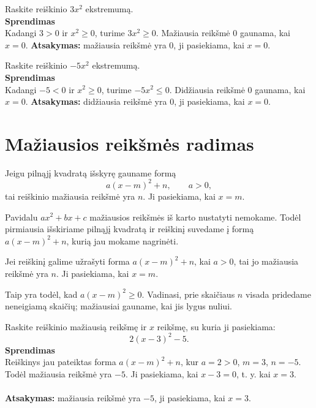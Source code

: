 \documentclass[11pt,a4paper]{scrartcl}
\begin{document}
\begin{example}
Raskite reiškinio $3x^2$ ekstremumą.\\
\textbf{Sprendimas}\\
Kadangi $3>0$ ir $x^2\geq0$, turime $3x^2\geq0$. Mažiausia reikšmė $0$ gaunama, kai $x=0$.
\textbf{Atsakymas:} mažiausia reikšmė yra $0$, ji pasiekiama, kai $x=0$.
\end{example}

\begin{example}
Raskite reiškinio $-5x^2$ ekstremumą.\\
\textbf{Sprendimas}\\
Kadangi $-5<0$ ir $x^2\geq0$, turime $-5x^2\leq0$. Didžiausia reikšmė $0$ gaunama, kai $x=0$.
\textbf{Atsakymas:} didžiausia reikšmė yra $0$, ji pasiekiama, kai $x=0$.
\end{example}

\section{Mažiausios reikšmės radimas}

Jeigu pilnąjį kvadratą išskyrę gauname formą
\[
a(x-m)^2+n, \qquad a>0,
\]
tai reiškinio mažiausia reikšmė yra $n$. Ji pasiekiama, kai $x=m$.

Pavidalu $ax^2+bx+c$ mažiausios reikšmės iš karto nustatyti nemokame. Todėl pirmiausia išskiriame pilnąjį kvadratą ir reiškinį suvedame į formą $a(x-m)^2+n$, kurią jau mokame nagrinėti.

\begin{property}
Jei reiškinį galime užrašyti forma $a(x-m)^2+n$, kai $a>0$, tai jo mažiausia reikšmė yra $n$. Ji pasiekiama, kai $x=m$.
\end{property}

Taip yra todėl, kad $a(x-m)^2\geq0$. Vadinasi, prie skaičiaus $n$ visada pridedame neneigiamą skaičių; mažiausiai gauname, kai jis lygus nuliui.

\begin{example}
Raskite reiškinio mažiausią reikšmę ir $x$ reikšmę, su kuria ji pasiekiama:
\[
2(x-3)^2-5.
\]
\textbf{Sprendimas}\\
Reiškinys jau pateiktas forma $a(x-m)^2+n$, kur $a=2>0$, $m=3$, $n=-5$. Todėl mažiausia reikšmė yra $-5$. Ji pasiekiama, kai $x-3=0$, t. y. kai $x=3$.\\ \\
\textbf{Atsakymas:} mažiausia reikšmė yra $-5$, ji pasiekiama, kai $x=3$.
\end{example}
\end{document}
